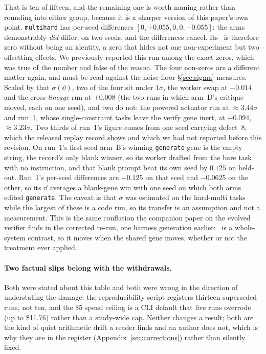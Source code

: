 \documentclass[11pt]{article}
\begin{document}
That is ten of fifteen, and the remaining one is worth naming rather than rounding into either
group, because it is a sharper version of this paper's own point. \texttt{multihard} has per-seed
differences $[0, +0.055, 0, 0, -0.055]$: the arms demonstrably \emph{did} differ, on two seeds, and
the differences cancel. Its \dd\ is therefore zero without being an identity, a zero that hides
not one non-experiment but two offsetting effects. We previously reported this run among the exact
zeros, which was true of the number and false of the reason. The four
non-zeros are a different matter again, and must be read against the noise floor
\S\ref{sec:sigma} measures. Scaled by that $\sigma(\dd)$, two of the
four sit under $1\sigma$, the worker swap at $-0.014$ and the cross-\emph{lineage} run at $+0.008$
(the two runs in which arm~D's critique moved, each on one seed),
and two do not: the powered actuator run at $\approx\!3.44\sigma$ and run~1, whose
single-constraint tasks leave the verify gene inert, at $-0.094$, $\approx\!3.23\sigma$. Two thirds
of run~1's figure comes from one seed carrying defect~8, which the released replay record shows and which we had not reported
before this revision. On run~1's first seed arm~B's winning \texttt{generate} gene is the empty
string, the record's only blank winner, so its worker drafted from the bare task with no
instruction, and that blank prompt beat its own seed by $0.125$ on held-out. Run~1's per-seed
differences are $-0.125$ on that seed and $-0.0625$ on the other, so its $\dd$ averages a blank-gene
win with one seed on which both arms edited \texttt{generate}. The caveat
is that $\sigma$ was estimated on
the hard-multi tasks while the largest of these is a code run, so its transfer is an assumption and not a
measurement. This is the same conflation the companion paper on the evolved verifier finds in the corrected re-run, one
harness generation earlier: \dd\ is a whole-system contrast, so it moves when the shared gene
moves, whether or not the treatment ever applied.

\paragraph{Two factual slips belong with the withdrawals.} Both were stated about this table and
both were wrong in the direction of understating the damage:
the reproducibility script registers thirteen superseded runs, not ten,
and the \$5 spend ceiling is a CLI default that five runs overrode
(up to \$11.76) rather than a study-wide cap. Neither changes a result; both are the kind of quiet
arithmetic drift a reader finds and an author does not, which is why they are in the register
(Appendix~\ref{sec:corrections}) rather than silently fixed.
\end{document}
